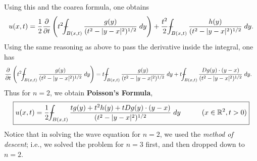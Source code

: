 \documentclass{article}
\def\Xint#1{\mathchoice
	{\XXint\displaystyle\textstyle{#1}}%
	{\XXint\textstyle\scriptstyle{#1}}%
	{\XXint\scriptstyle\scriptscriptstyle{#1}}%
	{\XXint\scriptscriptstyle\scriptscriptstyle{#1}}%
	\!\int}
\def\XXint#1#2#3{{\setbox0=\hbox{$#1{#2#3}{\int}$ }
		\vcenter{\hbox{$#2#3$ }}\kern-0.6\wd0}}
\def\dashint{\Xint-}
\begin{document}
Using this and the coarea formula, one obtains 
\begin{equation*}
	u(x, t) = \frac{1}{2}\frac{\partial}{\partial t}\left(t^{2}\dashint_{B(x,t)}\frac{g(y)}{(t^{2} - |y - x|^{2})^{1/2}}\;dy\right) + \frac{t^{2}}{2}\dashint_{B(x,t)}\frac{h(y)}{(t^{2} - |y - x|^{2})^{1/2}}\;dy.
\end{equation*}
Using the same reasoning as above to pass the derivative inside the integral, one has 
\begin{align*}
	\begin{split}
		\frac{\partial}{\partial t}\left(t^{2}\dashint_{B(x,t)}\frac{g(y)}{(t^{2} - |y - x|^{2})^{1/2}}\;dy\right) &= t\dashint_{B(x,t)}\frac{g(y)}{(t^{2} - |y - x|^{2})^{1/2}}\;dy + t\dashint_{B(x,t)}\frac{Dg(y) \cdot (y -x)}{(t^{2} - |y - x|^{2})^{1/2}}\;dy. 
	\end{split}
\end{align*}
Thus for $n = 2$, we obtain \textbf{Poisson's Formula}, 
\begin{equation}
	\boxed{
		u(x,t) = \frac{1}{2}\dashint_{B(x,t)}\frac{ tg(y) + t^{2}h(y) + tDg(y) \cdot (y -x) }{(t^{2} - |y - x|^{2})^{1/2}}\;dy \qquad \quad (x \in \mathbb{R}^{2}, t > 0)
	}
\end{equation}
Notice that in solving the wave equation for $n = 2$, we used the \textit{method of descent}; i.e., we solved the problem for $n = 3$ first, and then dropped down to $n =2$. 
\end{document}
